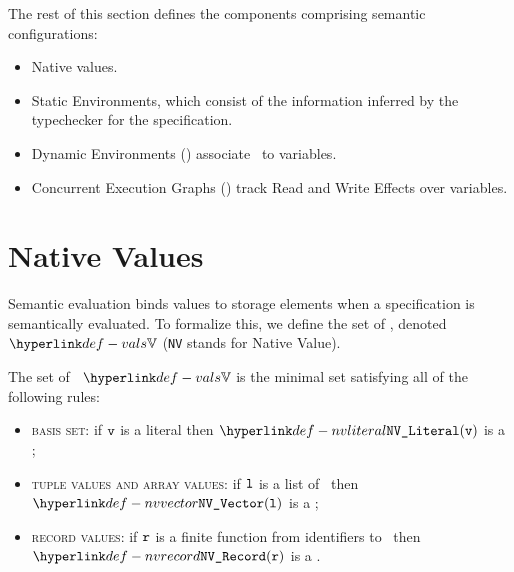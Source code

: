 The rest of this section defines the components comprising semantic configurations:
\begin{itemize}
    \item Native values.
    \item Static Environments, which consist of the information inferred
            by the typechecker for the specification.
    \item Dynamic Environments () associate \nativevalues\ to variables.
    \item Concurrent Execution Graphs () track Read and Write Effects over variables.
\end{itemize}

\hypertarget{def-vals}{}
\hypertarget{def-nativevalue}{}
\hypertarget{def-nativevalues}{}
\section{Native Values\label{sec:nativevalues}}
Semantic evaluation binds values to storage elements when a specification is semantically evaluated.
To formalize this, we define the set of \emph{\nativevalues}, denoted $\vals$
(\texttt{NV} stands for Native Value).

\ProseParagraph
The set of \nativevalues\ $\vals$ is the minimal set satisfying all of the following rules:
\begin{itemize}
  \item \textsc{basis set}: if $\texttt{v}$ is a literal then $\nvliteral(\vv)$ is a \nativevalue;
  \item \textsc{tuple values and array values}: if $\texttt{l}$ is a list of \nativevalues\ then $\nvvector(\vl)$ is a \nativevalue;
  \item \textsc{record values}: if $\texttt{r}$ is a finite function from identifiers to \nativevalues\ then $\nvrecord(\vr)$ is a \nativevalue.
\end{itemize}

\FormallyParagraph
\hypertarget{def-nvliteral}{}
\hypertarget{def-nvvector}{}
\hypertarget{def-nvrecord}{}

